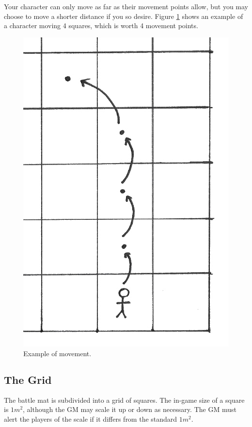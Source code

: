Your character can only move as far as their movement points allow, but you may choose to move a shorter distance if you so desire. Figure \ref{fig:movement} shows an example of a character moving 4 squares, which is worth 4 movement points.

\begin{figure}
    \centering
    \includegraphics{graphics/movement-trans.png}
    \caption{Example of movement.}
    \label{fig:movement}
\end{figure}

\subsection{The Grid}
The battle mat is subdivided into a grid of squares. 
The in-game size of a square is $1m^2$, although the GM may scale it up or down as necessary.
The GM must alert the players of the scale if it differs from the standard $1m^2$.


